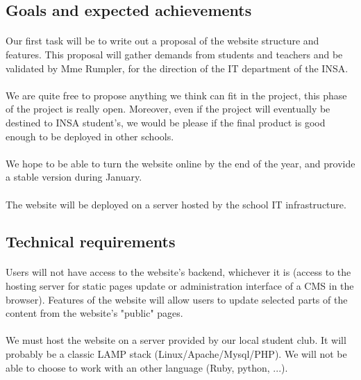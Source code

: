 \subsection{Goals and expected achievements}

\paragraph{} Our first task will be to write out a proposal of the website
structure and features. This proposal will gather demands from students and
teachers and be validated by Mme Rumpler, for the direction of the IT
department of the INSA.

\paragraph{} We are quite free to propose anything we think can fit in the
project, this phase of the project is really open. Moreover, even if the project
will eventually be destined to INSA student's, we would be please if the
final product is good enough to be deployed in other schools.

\paragraph{} We hope to be able to turn the website online by the end of the
year, and provide a stable version during January.

\paragraph{} The website will be deployed on a server hosted by the school IT
infrastructure.

\subsection{Technical requirements}

\paragraph{} Users will not have access to the website's backend, whichever it
is (access to the hosting server for static pages update or administration
interface of a CMS in the browser). Features of the website will allow users to
update selected parts of the content from the website's "public" pages.

\paragraph{} We must host the website on a server provided by our local student
club. It will probably be a classic LAMP stack (Linux/Apache/Mysql/PHP). We will
not be able to choose to work with an other language (Ruby, python, ...).

